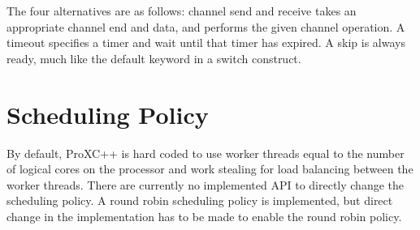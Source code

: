 The four alternatives are as follows: channel send and receive takes an appropriate channel end and data, and performs the given channel operation. A timeout specifies a timer and wait until that timer has expired. A skip is always ready, much like the default keyword in a switch construct. 


\section{Scheduling Policy}
\label{sec:scheduling_policy}

By default, ProXC++ is hard coded to use worker threads equal to the number of logical cores on the processor and work stealing for load balancing between the worker threads. There are currently no implemented API to directly change the scheduling policy. A round robin scheduling policy is implemented, but direct change in the implementation has to be made to enable the round robin policy.

